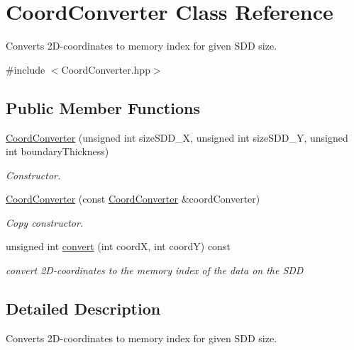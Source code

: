 \hypertarget{classCoordConverter}{}\section{Coord\+Converter Class Reference}
\label{classCoordConverter}


Converts 2\+D-\/coordinates to memory index for given S\+DD size.  




{\ttfamily \#include $<$Coord\+Converter.\+hpp$>$}

\subsection*{Public Member Functions}
\begin{DoxyCompactItemize}
\item 
\mbox{\hyperlink{classCoordConverter_a0e773a3ee5461119d7ff285fde45427d}{Coord\+Converter}} (unsigned int size\+S\+D\+D\+\_\+X, unsigned int size\+S\+D\+D\+\_\+Y, unsigned int boundary\+Thickness)
\begin{DoxyCompactList}\small\item\em Constructor. \end{DoxyCompactList}\item 
\mbox{\hyperlink{classCoordConverter_af11209a489a46dd335db0635d811999d}{Coord\+Converter}} (const \mbox{\hyperlink{classCoordConverter}{Coord\+Converter}} \&coord\+Converter)
\begin{DoxyCompactList}\small\item\em Copy constructor. \end{DoxyCompactList}\item 
\mbox{\label{classCoordConverter_ae62fc899a25ed7b6455927a6ddcccf52}} 
unsigned int \mbox{\hyperlink{classCoordConverter_ae62fc899a25ed7b6455927a6ddcccf52}{convert}} (int coordX, int coordY) const
\begin{DoxyCompactList}\small\item\em convert 2\+D-\/coordinates to the memory index of the data on the S\+DD \end{DoxyCompactList}\end{DoxyCompactItemize}


\subsection{Detailed Description}
Converts 2\+D-\/coordinates to memory index for given S\+DD size. 

